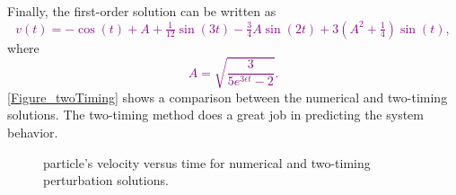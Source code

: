 \documentclass[12pt]{article}
\begin{document}
\begin{ex}
\begin{solution}
    Finally, the first-order solution can be written as\textcolor{purple}{
      $$v(t)=-\cos(t)+A+\tfrac{1}{12}\sin(3t)-\tfrac{3}{4}A\sin(2t)+3\left(A^2+\tfrac{1}{4}\right)\sin(t),$$}
    where\textcolor{purple}{
    $$A=\sqrt{\frac{3}{5e^{3\epsilon t}-2}}.$$}%
    \autoref{Figure_twoTiming} shows a comparison between the numerical and two-timing solutions. The two-timing method does a great job in predicting the system behavior.
    
  \begin{figure}[t]
    \centering
    \caption{particle's velocity versus time for numerical and two-timing perturbation solutions.}
    \label{Figure_twoTiming}
    \end{figure}
\end{solution}
\end{ex}
\end{document}
